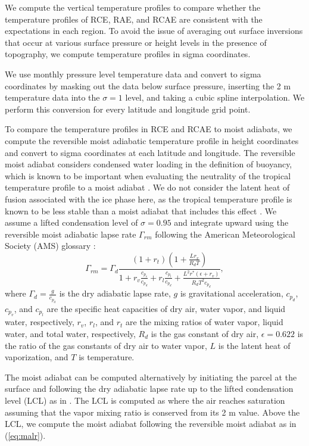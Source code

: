 \documentclass{ametsocV5}
\begin{document}
\appendix[A]

We compute the vertical temperature profiles to compare whether the temperature profiles of RCE, RAE, and RCAE are consistent with the expectations in each region. To avoid the issue of averaging out surface inversions that occur at various surface pressure or height levels in the presence of topography, we compute temperature profiles in sigma coordinates.

We use monthly pressure level temperature data and convert to sigma coordinates by masking out the data below surface pressure, inserting the 2 m temperature data into the $\sigma=1$ level, and taking a cubic spline interpolation. We perform this conversion for every latitude and longitude grid point. 

To compare the temperature profiles in RCE and RCAE to moist adiabats, we compute the reversible moist adiabatic temperature profile in height coordinates and convert to sigma coordinates at each latitude and longitude. The reversible moist adiabat considers condensed water loading in the definition of buoyancy, which is known to be important when evaluating the neutrality of the tropical temperature profile to a moist adiabat \citep{xu1989}. We do not consider the latent heat of fusion associated with the ice phase here, as the tropical temperature profile is known to be less stable than a moist adiabat that includes this effect \citep{williams1993}. We assume a lifted condensation level of $\sigma=0.95$ and integrate upward using the reversible moist adiabatic lapse rate $\Gamma_{rm}$ following the American Meteorological Society (AMS) glossary \citep{ams2021}:
\begin{equation} \label{eq:malr}
  \Gamma_{rm} = \Gamma_d \frac{(1+r_t)\left(1+\frac{L r_v}{R_d T}\right)}{1+r_v\frac{c_{p_v}}{c_{p_d}}+r_l\frac{c_{p_l}}{c_{p_d}}+\frac{L^2 r^*(\epsilon+r_v)}{R_d T^2 c_{p_d}}},
\end{equation}
where $\Gamma_d=\frac{g}{c_{p_d}}$ is the dry adiabatic lapse rate, $g$ is gravitational acceleration, $c_{p_d}$, $c_{p_v}$, and $c_{p_l}$ are the specific heat capacities of dry air, water vapor, and liquid water, respectively, $r_v$, $r_l$, and $r_t$ are the mixing ratios of water vapor, liquid water, and total water, respectively, $R_d$ is the gas constant of dry air, $\epsilon=0.622$ is the ratio of the gas constants of dry air to water vapor, $L$ is the latent heat of vaporization, and $T$ is temperature.

The moist adiabat can be computed alternatively by initiating the parcel at the surface and following the dry adiabatic lapse rate up to the lifted condensation level (LCL) as in \cite{miyawaki2020}. The LCL is computed as where the air reaches saturation assuming that the vapor mixing ratio is conserved from its 2 m value. Above the LCL, we compute the moist adiabat following the reversible moist adiabat as in (\ref{eq:malr}).
\end{document}
